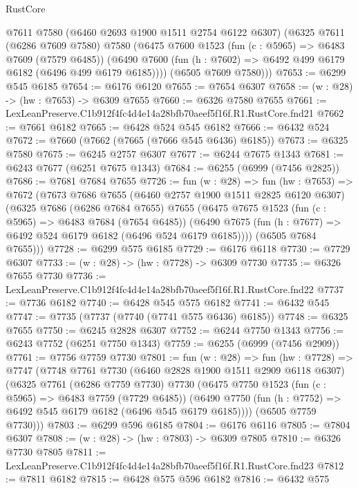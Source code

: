 \begin{lexlean}{RustCore}
\begin{coremodule}
      @7611
      @7580
      (@6460 @2693 @1900 @1511 @2754 @6122 @6307)
      (@6325
        @7611
        (@6286 @7609 @7580)
        @7580
        (@6475
          @7600
          @1523
          (fun (c : @5965) => @6483 @7609 (@7579 @6485))
          (@6490 @7600 (fun (h : @7602) => @6492 @499 @6179 @6182 (@6496 @499 @6179 @6185))))
        (@6505 @7609 @7580)))
@7653 := @6299 @545 @6185
@7654 := @6176 @6120
@7655 := @7654 @6307
@7658 := (w : @28) -> (hw : @7653) -> @6309 @7655
@7660 := @6326 @7580 @7655
@7661 := LexLeanPreserve.C1b912f4fc4d4e14a28bfb70aeef5f16f.R1.RustCore.fnd21
@7662 := @7661 @6182
@7665 := @6428 @524 @545 @6182
@7666 := @6432 @524
@7672 := @7660 (@7662 (@7665 (@7666 @545 @6436) @6185))
@7673 := @6325 @7580
@7675 := @6245 @2757 @6307
@7677 := @6244 @7675 @1343
@7681 := @6243 @7677 (@6251 @7675 @1343)
@7684 := @6255 (@6999 (@7456 @2825))
@7686 := @7681 @7684 @7655
@7726 := fun (w : @28) =>
  fun (hw : @7653) =>
  @7672
    (@7673
      @7686
      @7655
      (@6460 @2757 @1900 @1511 @2825 @6120 @6307)
      (@6325
        @7686
        (@6286 @7684 @7655)
        @7655
        (@6475
          @7675
          @1523
          (fun (c : @5965) => @6483 @7684 (@7654 @6485))
          (@6490 @7675 (fun (h : @7677) => @6492 @524 @6179 @6182 (@6496 @524 @6179 @6185))))
        (@6505 @7684 @7655)))
@7728 := @6299 @575 @6185
@7729 := @6176 @6118
@7730 := @7729 @6307
@7733 := (w : @28) -> (hw : @7728) -> @6309 @7730
@7735 := @6326 @7655 @7730
@7736 := LexLeanPreserve.C1b912f4fc4d4e14a28bfb70aeef5f16f.R1.RustCore.fnd22
@7737 := @7736 @6182
@7740 := @6428 @545 @575 @6182
@7741 := @6432 @545
@7747 := @7735 (@7737 (@7740 (@7741 @575 @6436) @6185))
@7748 := @6325 @7655
@7750 := @6245 @2828 @6307
@7752 := @6244 @7750 @1343
@7756 := @6243 @7752 (@6251 @7750 @1343)
@7759 := @6255 (@6999 (@7456 @2909))
@7761 := @7756 @7759 @7730
@7801 := fun (w : @28) =>
  fun (hw : @7728) =>
  @7747
    (@7748
      @7761
      @7730
      (@6460 @2828 @1900 @1511 @2909 @6118 @6307)
      (@6325
        @7761
        (@6286 @7759 @7730)
        @7730
        (@6475
          @7750
          @1523
          (fun (c : @5965) => @6483 @7759 (@7729 @6485))
          (@6490 @7750 (fun (h : @7752) => @6492 @545 @6179 @6182 (@6496 @545 @6179 @6185))))
        (@6505 @7759 @7730)))
@7803 := @6299 @596 @6185
@7804 := @6176 @6116
@7805 := @7804 @6307
@7808 := (w : @28) -> (hw : @7803) -> @6309 @7805
@7810 := @6326 @7730 @7805
@7811 := LexLeanPreserve.C1b912f4fc4d4e14a28bfb70aeef5f16f.R1.RustCore.fnd23
@7812 := @7811 @6182
@7815 := @6428 @575 @596 @6182
@7816 := @6432 @575

\end{coremodule}
\end{lexlean}
